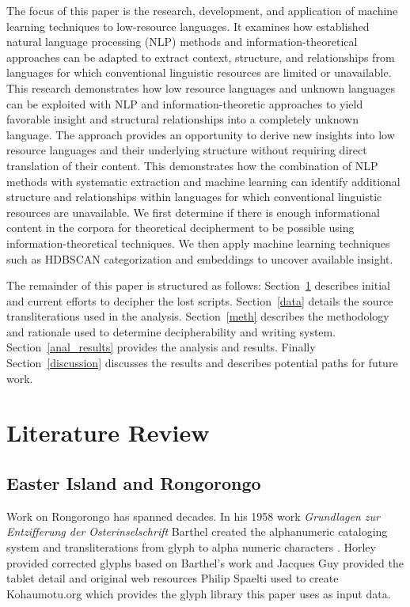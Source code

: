 \documentclass[preprint,12pt]{elsarticle}
\begin{document}
The focus of this paper is the research, development, and application of machine learning techniques to low-resource languages.  It examines how established natural language processing (NLP) methods and information-theoretical approaches can be adapted to extract context, structure, and relationships from languages for which conventional linguistic resources are limited or unavailable.  This research demonstrates how low resource languages and unknown languages can be exploited with NLP and information-theoretic approaches to yield favorable insight and structural relationships into a completely unknown language.  The approach provides an opportunity to derive new insights into low resource languages and their underlying structure without requiring direct translation of their content.  This demonstrates how the combination of NLP methods with systematic extraction and machine learning can identify additional structure and relationships within languages for which conventional linguistic resources are unavailable.  We first determine if there is enough informational content in the corpora for theoretical decipherment to be possible using information-theoretical techniques. We then apply machine learning techniques such as HDBSCAN categorization and embeddings to uncover available insight. 


The remainder of this paper is structured as follows: Section~\ref{lit} describes initial and current efforts to decipher the lost scripts. Section~\ref{data} details the source transliterations used in the analysis. Section~\ref{meth} describes the methodology and rationale used to determine decipherability and writing system.  Section~\ref{anal_results} provides the analysis and results. Finally Section~\ref{discussion} discusses the results and describes potential paths for future work. 

\section{Literature Review}
\label{lit}
\subsection{Easter Island and Rongorongo}
Work on Rongorongo has spanned decades. In his 1958 work \emph{Grundlagen zur Entzifferung der Osterinselschrift} Barthel created the alphanumeric cataloging system and transliterations from glyph to alpha numeric characters \cite{barthel1958grundlagen}. Horley provided corrected glyphs based on Barthel's work \cite{horley2021rongorongo} and Jacques Guy provided the tablet detail \cite{guy_rongorongo_org} and original web resources Philip Spaelti used to create Kohaumotu.org which provides the glyph library this paper uses as input data. \cite{spaelti_2012_glyph}
\end{document}
